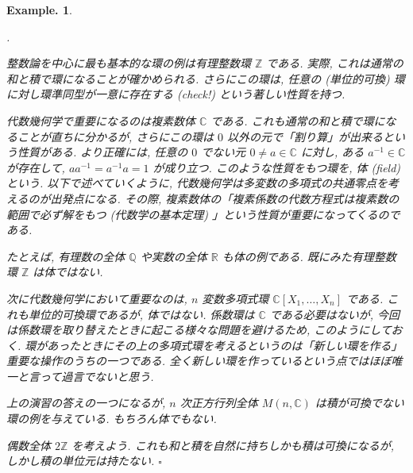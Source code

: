 \documentclass[openany, a4paper, oneside]{jsbook}
\newcounter{enum2}
\renewenvironment{enumerate}{%
\begin{list}%
{%
\arabic{enum2}.\ \,%
}%
{%
\usecounter{enum2}
\setlength{\itemindent}{0pt}%
\setlength{\leftmargin}{15pt}%
\setlength{\rightmargin}{0pt}%
\setlength{\labelsep}{0pt}%
\setlength{\labelwidth}{6pt}%
\setlength{\itemsep}{0pt}%
\setlength{\parsep}{0pt}%
\setlength{\listparindent}{0pt}%
}
}{%
\end{list}%
}
\theoremstyle{break}
\theoremstyle{breakdefn}
\newtheorem{ex}[thm]{Example.}
\newcommand{\fin}{\hfill $\square$ \par}
\begin{document}
\begin{ex}
\begin{enumerate}
\item 整数論を中心に最も基本的な環の例は有理整数環 $\mathbb{Z}$ である.
   実際, これは通常の和と積で環になることが確かめられる.
   さらにこの環は, 任意の (単位的可換) 環に対し環準同型が一意に存在する (check!) という著しい性質を持つ.
\item 代数幾何学で重要になるのは複素数体 $\mathbb{C}$ である.
   これも通常の和と積で環になることが直ちに分かるが, さらにこの環は $0$ 以外の元で「割り算」が出来るという性質がある.
   より正確には, 任意の $0$ でない元 $0 \neq a \in \mathbb{C}$ に対し,
   ある $a^{-1} \in \mathbb{C}$ が存在して,  $aa^{-1}=a^{-1}a=1$ が成り立つ.
   このような性質をもつ環を, 体 (field) という.
   以下で述べていくように, 代数幾何学は多変数の多項式の共通零点を考えるのが出発点になる.
   その際, 複素数体の「複素係数の代数方程式は複素数の範囲で必ず解をもつ (代数学の基本定理) 」という性質が重要になってくるのである.
\item たとえば, 有理数の全体 $\mathbb{Q}$ や実数の全体 $\mathbb{R}$ も体の例である.
   既にみた有理整数環 $\mathbb{Z}$ は体ではない.
\item 次に代数幾何学において重要なのは,  $n$ 変数多項式環 $\mathbb{C}[X_1,\dots,X_n]$ である.
   これも単位的可換環であるが, 体ではない.
   係数環は $\mathbb{C}$ である必要はないが,
   今回は係数環を取り替えたときに起こる様々な問題を避けるため, このようにしておく.
   環があったときにその上の多項式環を考えるというのは「新しい環を作る」重要な操作のうちの一つである.
   全く新しい環を作っているという点ではほぼ唯一と言って過言でないと思う.
\item 上の演習の答えの一つになるが,  $n$ 次正方行列全体 $M (n,\mathbb{C})$ は積が可換でない環の例を与えている.
   もちろん体でもない.
\item 偶数全体 $2\mathbb{Z}$ を考えよう.
   これも和と積を自然に持ちしかも積は可換になるが, しかし積の単位元は持たない. \fin
\end{enumerate}
\end{ex}
\end{document}

